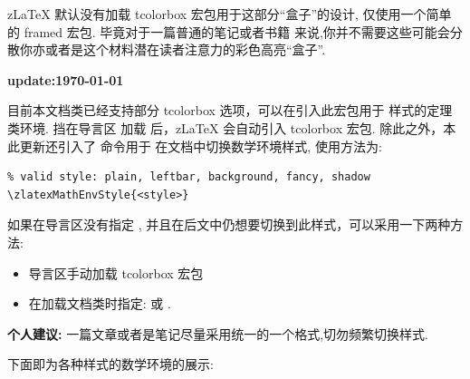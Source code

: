z\LaTeX{} 默认没有加载 tcolorbox 宏包用于这部分``盒子''的设计, 仅使用一个简单的 framed 宏包. 毕竟对于一篇普通的笔记或者书籍
来说,你并不需要这些可能会分散你亦或者是这个材料潜在读者注意力的彩色高亮``盒子''. 

\bigskip
\noindent\textbf{update:\today}\par
目前本文档类已经支持部分 tcolorbox 选项，可以在引入此宏包用于  样式的定理类环境. 挡在导言区
加载 后，z\LaTeX{} 会自动引入 tcolorbox 宏包. 除此之外，本此更新还引入了 \cmd{\zlatexMathEnvStyle} 命令用于
在文档中切换数学环境样式, 使用方法为:
\begin{verbatim}
% valid style: plain, leftbar, background, fancy, shadow
\zlatexMathEnvStyle{<style>}
\end{verbatim}

\begin{remark}
如果在导言区没有指定 , 并且在后文中仍想要切换到此样式，可以采用一下两种方法:
\begin{itemize}
  \item 导言区手动加载 tcolorbox 宏包
  \item 在加载文档类时指定: 或 .
\end{itemize} 

\noindent\textbf{个人建议:} 一篇文章或者是笔记尽量采用统一的一个格式,切勿频繁切换样式.
\end{remark}

下面即为各种样式的数学环境的展示:

\begin{theorem}\label{thm:test}
    \boomen \par 
    \boomcn
\end{theorem}

\begin{definition}
    \boomen \par 
    \boomcn
\end{definition}

\begin{lemma}
    \boomen \par 
    \boomcn
\end{lemma}

\begin{remark}
    \boomen \par 
    \boomcn
\end{remark}


